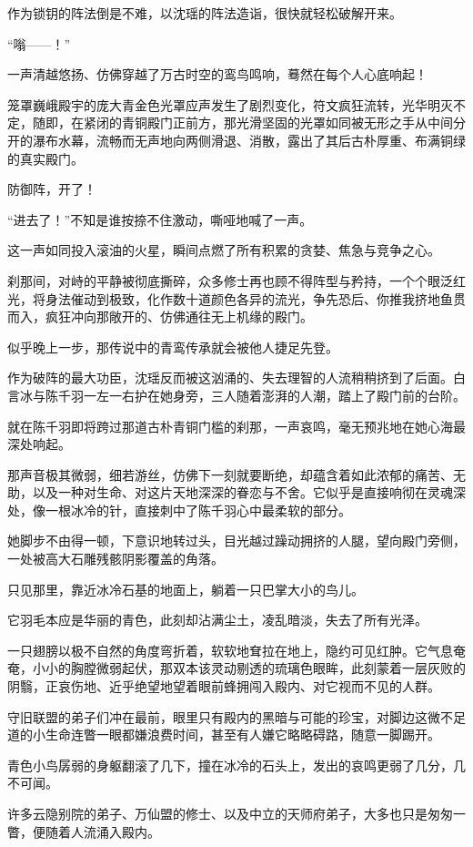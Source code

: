 作为锁钥的阵法倒是不难，以沈瑶的阵法造诣，很快就轻松破解开来。

“嗡——！”

一声清越悠扬、仿佛穿越了万古时空的鸾鸟鸣响，蓦然在每个人心底响起！

笼罩巍峨殿宇的庞大青金色光罩应声发生了剧烈变化，符文疯狂流转，光华明灭不定，随即，在紧闭的青铜殿门正前方，那光滑坚固的光罩如同被无形之手从中间分开的瀑布水幕，流畅而无声地向两侧滑退、消散，露出了其后古朴厚重、布满铜绿的真实殿门。

防御阵，开了！

“进去了！”不知是谁按捺不住激动，嘶哑地喊了一声。

这一声如同投入滚油的火星，瞬间点燃了所有积累的贪婪、焦急与竞争之心。

刹那间，对峙的平静被彻底撕碎，众多修士再也顾不得阵型与矜持，一个个眼泛红光，将身法催动到极致，化作数十道颜色各异的流光，争先恐后、你推我挤地鱼贯而入，疯狂冲向那敞开的、仿佛通往无上机缘的殿门。

似乎晚上一步，那传说中的青鸾传承就会被他人捷足先登。

作为破阵的最大功臣，沈瑶反而被这汹涌的、失去理智的人流稍稍挤到了后面。白言冰与陈千羽一左一右护在她身旁，三人随着澎湃的人潮，踏上了殿门前的台阶。

就在陈千羽即将跨过那道古朴青铜门槛的刹那，一声哀鸣，毫无预兆地在她心海最深处响起。

那声音极其微弱，细若游丝，仿佛下一刻就要断绝，却蕴含着如此浓郁的痛苦、无助，以及一种对生命、对这片天地深深的眷恋与不舍。它似乎是直接响彻在灵魂深处，像一根冰冷的针，直接刺中了陈千羽心中最柔软的部分。

她脚步不由得一顿，下意识地转过头，目光越过躁动拥挤的人腿，望向殿门旁侧，一处被高大石雕残骸阴影覆盖的角落。

只见那里，靠近冰冷石基的地面上，躺着一只巴掌大小的鸟儿。

它羽毛本应是华丽的青色，此刻却沾满尘土，凌乱暗淡，失去了所有光泽。

一只翅膀以极不自然的角度弯折着，软软地耷拉在地上，隐约可见红肿。它气息奄奄，小小的胸膛微弱起伏，那双本该灵动剔透的琉璃色眼眸，此刻蒙着一层灰败的阴翳，正哀伤地、近乎绝望地望着眼前蜂拥闯入殿内、对它视而不见的人群。

守旧联盟的弟子们冲在最前，眼里只有殿内的黑暗与可能的珍宝，对脚边这微不足道的小生命连瞥一眼都嫌浪费时间，甚至有人嫌它略略碍路，随意一脚踢开。

青色小鸟孱弱的身躯翻滚了几下，撞在冰冷的石头上，发出的哀鸣更弱了几分，几不可闻。

许多云隐别院的弟子、万仙盟的修士、以及中立的天师府弟子，大多也只是匆匆一瞥，便随着人流涌入殿内。

